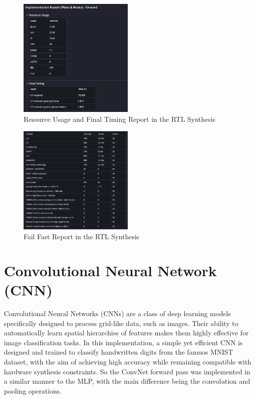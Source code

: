 \documentclass{article}
\begin{document}
\begin{figure}[H]
    \centering
    \includegraphics[width=0.5\textwidth]{./assets/MLP/implementation-resourceusagefinaltiming.png}
    \caption{Resource Usage and Final Timing Report in the RTL Synthesis}
    \label{fig:rtl-synthesis}
\end{figure}




\begin{figure}[H]
    \centering
    \includegraphics[width=0.5\textwidth]{./assets/MLP/implementation-failfast.png}
    \caption{Fail Fast Report in the RTL Synthesis}
    \label{fig:fail-fast}
\end{figure}

\newpage


\section{Convolutional Neural Network (CNN)}
Convolutional Neural Networks (CNNs) are a class of deep learning models specifically designed to process grid-like data, such as images. Their ability to automatically learn spatial hierarchies of features makes them highly effective for image classification tasks. In this implementation, a simple yet efficient CNN is designed and trained to classify handwritten digits from the famuos MNIST dataset, with the aim of achieving high accuracy while remaining compatible with hardware synthesis constraints. So the ConvNet forward pass was implemented in a similar manner to the MLP, with the main difference being the convolution and pooling operations.
\end{document}

